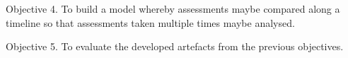 
Objective 4. To build a model whereby assessments maybe compared along a timeline so that assessments taken multiple times maybe analysed.





Objective 5. To evaluate the developed artefacts from the previous objectives.

